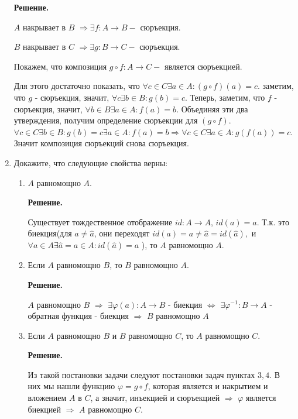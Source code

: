 \begin{enumerate}
\textbf{Решение.} 

$A$ накрывает в $B$ $\Rightarrow \exists f:A\rightarrow B - $ сюръекция.

$B$ накрывает в $C$ $\Rightarrow \exists g:B\rightarrow C - $ сюръекция.

Покажем, что композиция $g \circ f : A\rightarrow C - $ является сюръекцией.

Для этого достаточно показать, что $\forall c \in C \exists a \in A : (g \circ f)(a) = c$. заметим, что $g$ - 
сюръекция, значит, $\forall c \exists b \in B : g(b) = c$. Теперь, заметим, что $f$ - сюръекция, значит, 
$\forall b \in B \exists a \in A : f(a) = b$. Объединяя эти два утверждения, получим определение сюръекции 
для $(g \circ f)$. $\forall c \in C \exists b \in B : g(b) = c \exists a \in A : f(a) = b \Rightarrow \forall 
c \in C \exists a \in A : g(f(a)) = c$. Значит композиция сюръекций снова сюръекция.

\item Докажите, что следующие свойства верны:
\begin{enumerate}
\item $A$ равномощно $A$.

\textbf{Решение.} 

Существует тождественное отображение $id: A\rightarrow A$, $id(a) = a$. Т.к. это биекция(для $a\neq \hat{a}$, 
они переходят $id(a) = a \neq \hat{a} = id(\hat{a}),$ и $\forall a\in A \exists\hat{a} = a \in A : 
id(\hat{a}) = a$ ), то $A$ равномощно $A$. 

\item Если $A$ равномощно $B$, то $B$ равномощно $A$.

\textbf{Решение.} 

$A$ равномощно $B$ $\Rightarrow$ $\exists \varphi(a):A\rightarrow B$ - биекция $\Leftrightarrow$ $\exists 
\varphi^{-1} : B \rightarrow A$ - обратная функция - биекция $\Rightarrow$ $B$ равномощно $A$ 

\item Если $A$ равномощно $B$ и $B$ равномощно $C$, то $A$ равномощно $C$.

\textbf{Решение.} 

Из такой постановки задачи следуют постановки задач пунктах $3, 4$. В них мы нашли функцию $\varphi = g \circ 
f$, которая является и накрытием и вложением $A$ в $C$, а значит, инъекцией и сюръекцией $\Rightarrow$ 
$\varphi$ является биекцией $\Rightarrow$ $A$ равномощно $C$.

\end{enumerate}


\end{enumerate}

